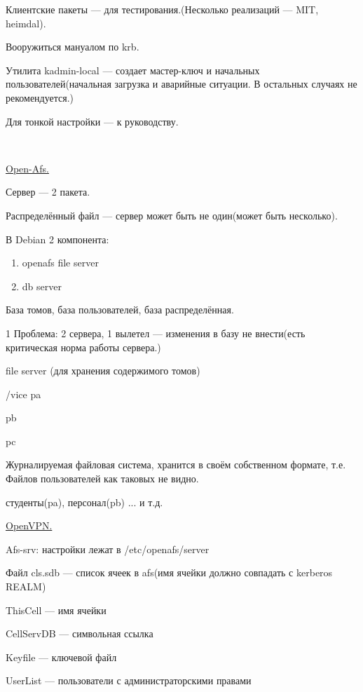 \par 
Клиентские пакеты — для тестирования.(Несколько
реализаций — MIT, heimdal).
\par 
Вооружиться мануалом по krb.
\par 
Утилита kadmin-local — создает мастер-ключ
и начальных пользователей(начальная
загрузка и аварийные ситуации. В остальных
случаях не рекомендуется.)
\par 
Для тонкой настройки — к руководству.
\par 
\\

\par 
\underline{Open-Afs.}
\par 
Сервер — 2 пакета.
\par 
Распределённый файл — сервер может
быть не один(может быть несколько).
\par 
В Debian 2 компонента:
\begin{enumerate}
	\item \par 
	openafs file server
	\item \par 
	db server
\end{enumerate}
\par 
База томов, база пользователей, база
распределённая.
\par 
1 Проблема: 2 сервера, 1 вылетел — изменения
в базу не внести(есть критическая норма
работы сервера.)
\par 
file server (для хранения содержимого томов)
\par 
/vice pa
\par 
  pb
\par 
  pc
\par 
Журналируемая файловая система, хранится
в своём собственном формате, т.е. Файлов
пользователей как таковых не видно.
\par 
студенты(pa), персонал(pb) ... и т.д.
\par 
\underline{OpenVPN.}
\par 
Afs-srv: настройки лежат в /etc/openafs/server
\par 
Файл cls.sdb — список ячеек в afs(имя ячейки
должно совпадать с kerberos REALM)
\par 
ThisCell — имя ячейки
\par 
CellServDB — символьная ссылка
\par 
Keyfile — ключевой файл
\par 
UserList — пользователи с администраторскими
правами

